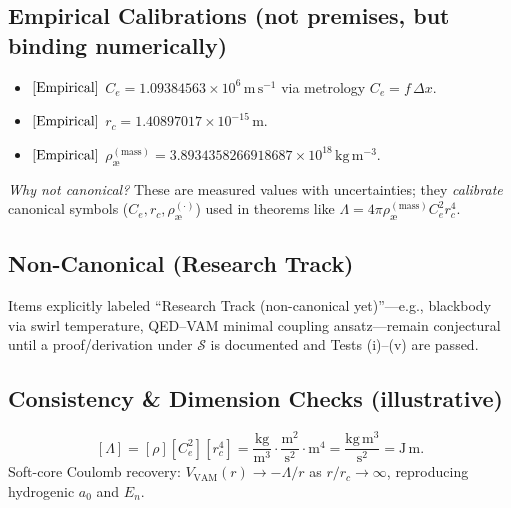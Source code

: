\documentclass[11pt, a4paper]{article}
\begin{document}
    \subsection*{Empirical Calibrations (not premises, but binding numerically)}
    \begin{itemize}
        \item \([{\rm Empirical}]\) \(C_e = 1.09384563\times 10^6\,\mathrm{m\,s^{-1}}\) via metrology \(C_e=f\,\Delta x\).
        \item \([{\rm Empirical}]\) \(r_c = 1.40897017\times 10^{-15}\,\mathrm{m}\).
        \item \([{\rm Empirical}]\) \(\rho_{\text{\ae}}^{(\text{mass})} = 3.8934358266918687\times 10^{18}\,\mathrm{kg\,m^{-3}}\).
    \end{itemize}
    \emph{Why not canonical?} These are measured values with uncertainties; they \emph{calibrate} canonical symbols (\(C_e,r_c,\rho_{\text{\ae}}^{(\cdot)}\)) used in theorems like \(\Lambda=4\pi\rho_{\text{\ae}}^{(\text{mass})}C_e^2 r_c^4\).

    \subsection*{Non-Canonical (Research Track)}
    Items explicitly labeled “Research Track (non-canonical yet)”—e.g., blackbody via swirl temperature, QED–VAM minimal coupling ansatz—remain conjectural until a proof/derivation under \(\mathcal{S}\) is documented and Tests (i)–(v) are passed.

    \subsection*{Consistency & Dimension Checks (illustrative)}
    \[
        [\Lambda]=[\rho][C_e^2][r_c^4]
        =\frac{\mathrm{kg}}{\mathrm{m^3}}\cdot\frac{\mathrm{m^2}}{\mathrm{s^2}}\cdot\mathrm{m^4}
        =\frac{\mathrm{kg\,m^3}}{\mathrm{s^2}}
        =\mathrm{J\,m}.
    \]
    Soft-core Coulomb recovery: \(V_{\text{VAM}}(r)\to -\Lambda/r\) as \(r/r_c\to\infty\), reproducing hydrogenic \(a_0\) and \(E_n\). \cite{Schrodinger1926,Jackson1999}
\end{document}
